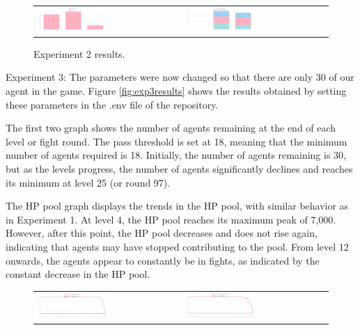 \begin{figure}[htbp]
\begin{tabular}{ll}
    \centering
    \includegraphics[width=0.5\textwidth]{007_team_4_agent_design/figures/EX2_3.jpg}
    &
    \includegraphics[width=0.5\textwidth]{007_team_4_agent_design/figures/EX2_4.jpg}
\end{tabular}
    \caption{Experiment 2 results.}
    \label{fig:exp2results}
\end{figure}


\newpage

Experiment 3: The parameters were now changed so that there are only 30 of our agent in the game. Figure \ref{fig:exp3results} shows the results obtained by setting these parameters in the .env file of the repository. 

\par The first two graph shows the number of agents remaining at the end of each level or fight round. The pass threshold is set at 18, meaning that the minimum number of agents required is 18. Initially, the number of agents remaining is 30, but as the levels progress, the number of agents significantly declines and reaches its minimum at level 25 (or round 97).

The HP pool graph displays the trends in the HP pool, with similar behavior as in Experiment 1. At level 4, the HP pool reaches its maximum peak of 7,000. However, after this point, the HP pool decreases and does not rise again, indicating that agents may have stopped contributing to the pool. From level 12 onwards, the agents appear to constantly be in fights, as indicated by the constant decrease in the HP pool.


\begin{figure}[htbp]
\begin{tabular}{ll}
    \centering
    \includegraphics[width=0.5\textwidth]{007_team_4_agent_design/figures/EX3_1.jpg}
    &
    \includegraphics[width=0.5\textwidth]{007_team_4_agent_design/figures/EX3_2.jpg}
\end{tabular}

\end{figure}

